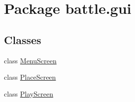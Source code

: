 \hypertarget{namespacebattle_1_1gui}{}\section{Package battle.\+gui}
\label{namespacebattle_1_1gui}
\subsection*{Classes}
\begin{DoxyCompactItemize}
\item 
class \hyperlink{classbattle_1_1gui_1_1_menu_screen}{Menu\+Screen}
\item 
class \hyperlink{classbattle_1_1gui_1_1_place_screen}{Place\+Screen}
\item 
class \hyperlink{classbattle_1_1gui_1_1_play_screen}{Play\+Screen}
\end{DoxyCompactItemize}
